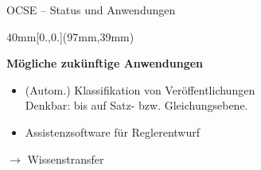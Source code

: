 \documentclass[
	ngerman,
	10pt,				%
	aspectratio=169 	%
]{beamer}
\begin{document}
\begin{frame}[t,fragile,label=ocse4]{\large OCSE -- Status { und Anwendungen}}
{\begin{textblock*}{40mm}[0.,0.](97mm,39mm)
\end{textblock*}



\pause

\medskip
\bigskip
\textbf{Mögliche zukünftige Anwendungen}

\begin{itemize}
 \item (Autom.) Klassifikation von Veröffentlichungen\\
 Denkbar: bis auf Satz- bzw. Gleichungsebene.
 
 \item Assistenzsoftware für Reglerentwurf
 
\end{itemize}

$\rightarrow$ Wissenstransfer

}

\end{frame}




  
\end{document}

